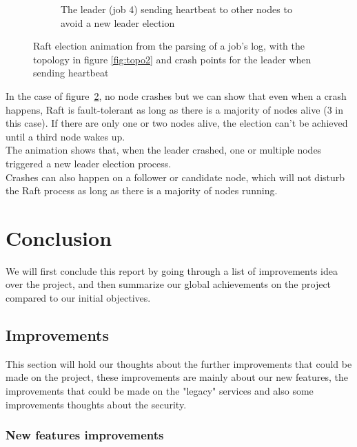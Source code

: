 \documentclass{eplmastersthesis}
\begin{document}
\begin{figure}[H]
\begin{subfigure}{.45\textwidth}
            \caption{The leader (job 4) sending heartbeat to other nodes to avoid a new leader election}
            \label{fig:ele4}
          \end{subfigure}

          \caption{Raft election animation from the parsing of a job's log, with the topology in figure \ref{fig:topo2}
          and crash points for the leader when sending heartbeat}
          \label{fig:election}
        \end{figure}

        In the case of figure~\ref{fig:election}, no node crashes but we can show
        that even when a crash happens, Raft is fault-tolerant as long as there
        is a majority of nodes alive (3 in this case). If there are only one or
        two nodes alive, the election can't be achieved until a third node
        wakes up.\\
        The animation shows that, when the leader crashed, one or multiple
        nodes triggered a new leader election process.\\
        Crashes can also happen on a follower or candidate node, which will not
        disturb the Raft process as long as there is a majority of nodes
        running.

  \chapter{Conclusion}

    We will first conclude this report by going through a list of improvements
    idea over the project, and then summarize our global achievements on the
    project compared to our initial objectives.

    \section{Improvements}

      This section will hold our thoughts about the further improvements
      that could be made on the project, these improvements are mainly about
      our new features, the improvements that could be made on the "legacy"
      services and also some improvements thoughts about the security.

      \subsection{New features improvements}
\end{document}
